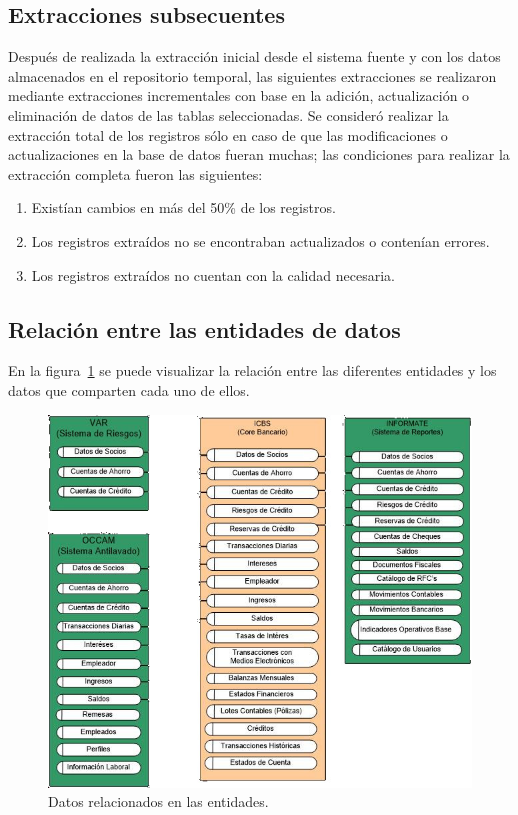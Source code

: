\subsection{Extracciones subsecuentes}

Después de realizada la extracción inicial desde el sistema fuente y con los
datos almacenados en el repositorio temporal, las siguientes extracciones se
realizaron mediante extracciones incrementales con base en la adición,
actualización o eliminación de datos de las tablas seleccionadas. Se consideró
realizar la extracción total de los registros sólo en caso de que las
modificaciones o actualizaciones en la base de datos fueran muchas; las
condiciones para realizar la extracción completa fueron las siguientes:

\begin{enumerate}
\item Existían cambios en más del 50\% de los registros.
\item Los registros extraídos no se encontraban actualizados o contenían
  errores.
\item Los registros extraídos no cuentan con la calidad necesaria.
\end{enumerate}

\subsection{Relación entre las entidades de datos}

En la figura~\ref{fig:datos-relacionados-en-las-entidades} se puede visualizar
la relación entre las diferentes entidades y los datos que comparten cada uno de
ellos.

\begin{figure}[htb]
  \begin{center}
    \includegraphics[width=\linewidth]{Relacion_entidades.jpg}
        \caption{Datos relacionados en las entidades.}
    \label{fig:datos-relacionados-en-las-entidades}
  \end{center}
\end{figure}

